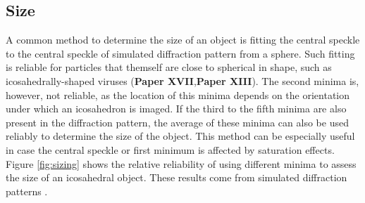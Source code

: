\subsection{Size}
A common method to determine the size of an object is fitting the central speckle to the central speckle of simulated diffraction pattern from a sphere. Such fitting is reliable for particles that themself are close to spherical in shape, such as icosahedrally-shaped viruses (\textbf{Paper XVII},\textbf{Paper XIII}). The second minima is, however, not reliable, as the location of this minima depends on the orientation under which an icosahedron is imaged. If the third to the fifth minima are also present in the diffraction pattern, the average of these minima can also be used reliably to determine the size of the object. This method can be especially useful in case the central speckle or first minimum is affected by saturation effects. Figure \ref{fig:sizing} shows the relative reliability of using different minima to assess the size of an icosahedral object. These results come from simulated diffraction patterns \cite{Hantke2016}.

